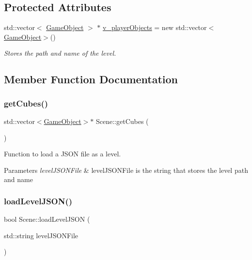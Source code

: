 \subsection*{Protected Attributes}
\begin{DoxyCompactItemize}
\item 
\mbox{\label{class_scene_a15f9f3b86f64168b5172bea1b499d07b}} 
std\+::vector$<$ \mbox{\hyperlink{class_game_object}{Game\+Object}} $>$ $\ast$ \mbox{\hyperlink{class_scene_a15f9f3b86f64168b5172bea1b499d07b}{v\+\_\+player\+Objects}} = new std\+::vector$<$\mbox{\hyperlink{class_game_object}{Game\+Object}}$>$()
\begin{DoxyCompactList}\small\item\em Stores the path and name of the level. \end{DoxyCompactList}\end{DoxyCompactItemize}


\subsection{Member Function Documentation}
\mbox{\label{class_scene_accfbee3379223ae8d452b6829dc591dc}} 
\subsubsection{\texorpdfstring{getCubes()}{getCubes()}}
{\footnotesize\ttfamily std\+::vector$<$\mbox{\hyperlink{class_game_object}{Game\+Object}}$>$$\ast$ Scene\+::get\+Cubes (\begin{DoxyParamCaption}{ }\end{DoxyParamCaption})}



Function to load a J\+S\+ON file as a level. 


\begin{DoxyParams}{Parameters}
{\em level\+J\+S\+O\+N\+File} & level\+J\+S\+O\+N\+File is the string that stores the level path and name \\
\hline
\end{DoxyParams}
\mbox{\label{class_scene_adc40ce0e3e79c9dbb504f42f7a55b153}} 
\subsubsection{\texorpdfstring{loadLevelJSON()}{loadLevelJSON()}}
{\footnotesize\ttfamily bool Scene\+::load\+Level\+J\+S\+ON (\begin{DoxyParamCaption}\item[{std\+::string}]{level\+J\+S\+O\+N\+File }\end{DoxyParamCaption})}



